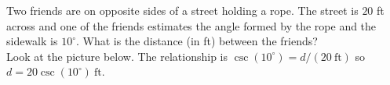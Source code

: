 Two friends are on opposite sides of a street holding a rope. The street is $20$ ft across and one of the friends estimates the angle formed by the rope and the sidewalk is $10^{\circ}$. What is the distance (in ft) between the friends?
\[\]
Look at the picture below. The relationship is $\csc(10^{\circ}) = d / (20\ \text{ft})$ so $d = 20\csc(10^{\circ})\ \text{ft}$.
